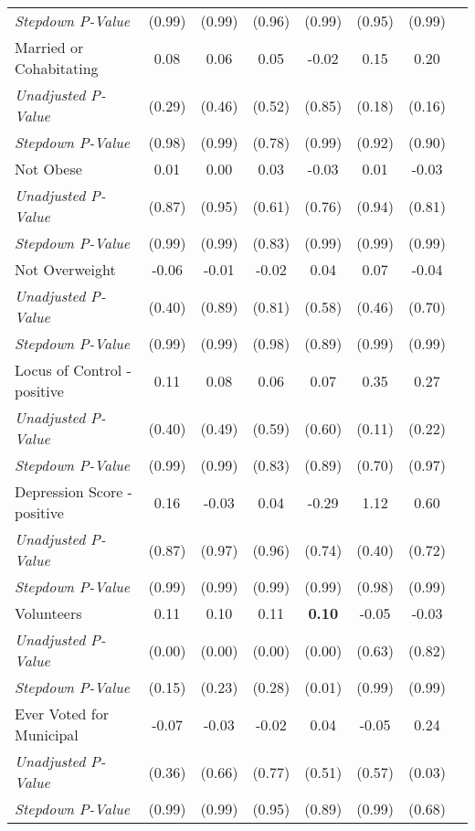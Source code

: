 \begin{tabular}{l c c c c c c c}
\quad \textit{Stepdown P-Value} & (0.99) & (0.99) & (0.96) & (0.99) & (0.95) & (0.99) \\
Married or Cohabitating & 0.08 & 0.06 & 0.05 & -0.02 & 0.15 & 0.20 \\
\quad \textit{Unadjusted P-Value} & (0.29) & (0.46) & (0.52) & (0.85) & (0.18) & (0.16) \\
\quad \textit{Stepdown P-Value} & (0.98) & (0.99) & (0.78) & (0.99) & (0.92) & (0.90) \\
Not Obese & 0.01 & 0.00 & 0.03 & -0.03 & 0.01 & -0.03 \\
\quad \textit{Unadjusted P-Value} & (0.87) & (0.95) & (0.61) & (0.76) & (0.94) & (0.81) \\
\quad \textit{Stepdown P-Value} & (0.99) & (0.99) & (0.83) & (0.99) & (0.99) & (0.99) \\
Not Overweight & -0.06 & -0.01 & -0.02 & 0.04 & 0.07 & -0.04 \\
\quad \textit{Unadjusted P-Value} & (0.40) & (0.89) & (0.81) & (0.58) & (0.46) & (0.70) \\
\quad \textit{Stepdown P-Value} & (0.99) & (0.99) & (0.98) & (0.89) & (0.99) & (0.99) \\
Locus of Control - positive & 0.11 & 0.08 & 0.06 & 0.07 & 0.35 & 0.27 \\
\quad \textit{Unadjusted P-Value} & (0.40) & (0.49) & (0.59) & (0.60) & (0.11) & (0.22) \\
\quad \textit{Stepdown P-Value} & (0.99) & (0.99) & (0.83) & (0.89) & (0.70) & (0.97) \\
Depression Score - positive & 0.16 & -0.03 & 0.04 & -0.29 & 1.12 & 0.60 \\
\quad \textit{Unadjusted P-Value} & (0.87) & (0.97) & (0.96) & (0.74) & (0.40) & (0.72) \\
\quad \textit{Stepdown P-Value} & (0.99) & (0.99) & (0.99) & (0.99) & (0.98) & (0.99) \\
Volunteers & 0.11 & 0.10 & 0.11 & \textbf{ 0.10 } & -0.05 & -0.03 \\
\quad \textit{Unadjusted P-Value} & (0.00) & (0.00) & (0.00) & (0.00) & (0.63) & (0.82) \\
\quad \textit{Stepdown P-Value} & (0.15) & (0.23) & (0.28) & (0.01) & (0.99) & (0.99) \\
Ever Voted for Municipal & -0.07 & -0.03 & -0.02 & 0.04 & -0.05 & 0.24 \\
\quad \textit{Unadjusted P-Value} & (0.36) & (0.66) & (0.77) & (0.51) & (0.57) & (0.03) \\
\quad \textit{Stepdown P-Value} & (0.99) & (0.99) & (0.95) & (0.89) & (0.99) & (0.68) \\

\end{tabular}
